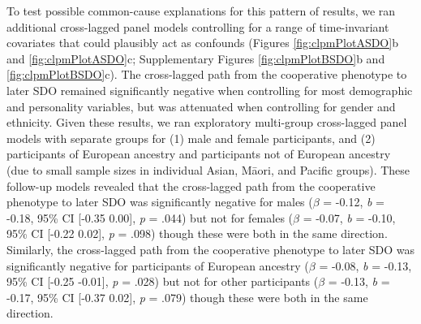 \documentclass[
  man,floatsintext]{apa6}
\begin{document}
To test possible common-cause explanations for this pattern of results,
we ran additional cross-lagged panel models controlling for a range of
time-invariant covariates that could plausibly act as confounds (Figures
\ref{fig:clpmPlotASDO}b and \ref{fig:clpmPlotASDO}c; Supplementary Figures
\ref{fig:clpmPlotBSDO}b and \ref{fig:clpmPlotBSDO}c). The cross-lagged path
from the cooperative phenotype to later SDO remained significantly negative when
controlling for most demographic and personality variables, but was attenuated
when controlling for gender and ethnicity. Given these results, we ran
exploratory multi-group cross-lagged panel models with separate groups for (1)
male and female participants, and (2) participants of European ancestry and
participants not of European ancestry (due to small sample sizes in individual
Asian, Māori, and Pacific groups). These follow-up models revealed that the
cross-lagged path from the cooperative phenotype to later SDO was significantly
negative for males (\(\beta\) =
-0.12, \emph{b} =
-0.18, 95\% CI {[}-0.35
0.00{]}, \emph{p} = .044) but not for females
(\(\beta\) = -0.07, \emph{b} =
-0.10, 95\% CI {[}-0.22
0.02{]}, \emph{p} = .098) though these were both
in the same direction. Similarly, the cross-lagged path from the cooperative
phenotype to later SDO was significantly negative for participants of European
ancestry (\(\beta\) = -0.08,
\emph{b} = -0.13, 95\% CI {[}-0.25
-0.01{]}, \emph{p} = .028) but not for other
participants (\(\beta\) = -0.13,
\emph{b} = -0.17, 95\% CI {[}-0.37
0.02{]}, \emph{p} = .079) though these were both
in the same direction.
\end{document}
